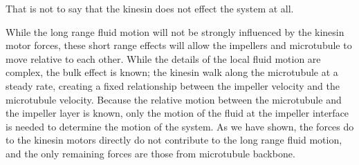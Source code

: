 \documentclass[11pt]{ucthesis}
\begin{document}
{That is not to say that the kinesin does not effect the system at all.

While the long range fluid motion will not be strongly influenced by the kinesin motor forces, these short range effects will allow the impellers and microtubule to move relative to each other. While the details of the local fluid motion are complex, the bulk effect is known; the kinesin walk along the microtubule at a steady rate, creating a fixed relationship between the impeller velocity and the microtubule velocity. 
Because the relative motion between the microtubule and the impeller layer is known, only the motion of the fluid at the impeller interface is needed to determine the motion of the system. 
As we have shown, the forces do to the kinesin motors directly do not contribute to the long range fluid motion, and the only remaining forces are those from microtubule backbone.

}
\end{document}
